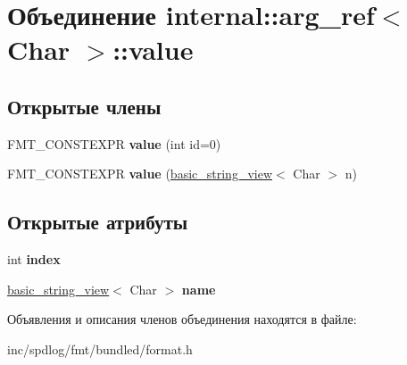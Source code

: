 \hypertarget{unioninternal_1_1arg__ref_1_1value}{}\section{Объединение internal\+:\+:arg\+\_\+ref$<$ Char $>$\+:\+:value}
\label{unioninternal_1_1arg__ref_1_1value}
\subsection*{Открытые члены}
\begin{DoxyCompactItemize}
\item 
\mbox{\label{unioninternal_1_1arg__ref_1_1value_a4c5baf48c2ea424d88137ac30bac998c}} 
F\+M\+T\+\_\+\+C\+O\+N\+S\+T\+E\+X\+PR {\bfseries value} (int id=0)
\item 
\mbox{\label{unioninternal_1_1arg__ref_1_1value_a51173bcfd520e653d011dd30c6774b84}} 
F\+M\+T\+\_\+\+C\+O\+N\+S\+T\+E\+X\+PR {\bfseries value} (\hyperlink{classbasic__string__view}{basic\+\_\+string\+\_\+view}$<$ Char $>$ n)
\end{DoxyCompactItemize}
\subsection*{Открытые атрибуты}
\begin{DoxyCompactItemize}
\item 
\mbox{\label{unioninternal_1_1arg__ref_1_1value_a12ab9dcd04fdf641d71cda27068a2e1e}} 
int {\bfseries index}
\item 
\mbox{\label{unioninternal_1_1arg__ref_1_1value_a67578a1d33ca6762149e3ac74d694391}} 
\hyperlink{classbasic__string__view}{basic\+\_\+string\+\_\+view}$<$ Char $>$ {\bfseries name}
\end{DoxyCompactItemize}


Объявления и описания членов объединения находятся в файле\+:\begin{DoxyCompactItemize}
\item 
inc/spdlog/fmt/bundled/format.\+h\end{DoxyCompactItemize}
